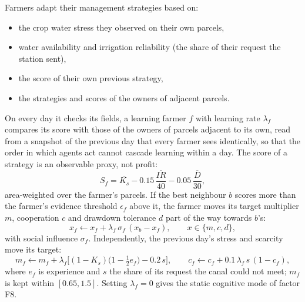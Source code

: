 \documentclass{article}
\begin{document}
\begin{changed}
Farmers adapt their management strategies based on:

\begin{itemize}
    \item the crop water stress they observed on their own parcels,
    \item water availability and irrigation reliability (the share of their request the station sent),
    \item the score of their own previous strategy,
    \item the strategies and scores of the owners of adjacent parcels.
\end{itemize}
\end{changed}

\begin{added}
On every day it checks its fields, a learning farmer $f$ with learning rate $\lambda_f$ compares its score with those of the owners of parcels adjacent to its own, read from a snapshot of the previous day that every farmer sees identically, so that the order in which agents act cannot cascade learning within a day. The score of a strategy is an observable proxy, not profit:
\begin{equation}
S_f = \overline{K_s} - 0.15\,\frac{\overline{IR}}{40} - 0.05\,\frac{\overline{D}}{30},
\label{eq:score}
\end{equation}
area-weighted over the farmer's parcels. If the best neighbour $b$ scores more than the farmer's evidence threshold $\epsilon_f$ above it, the farmer moves its target multiplier $m$, cooperation $c$ and drawdown tolerance $d$ part of the way towards $b$'s:
\begin{equation}
x_f \leftarrow x_f + \lambda_f\,\sigma_f\,(x_b - x_f), \qquad x \in \{m, c, d\},
\label{eq:copy}
\end{equation}
with social influence $\sigma_f$. Independently, the previous day's stress and scarcity move its target:
\begin{equation}
m_f \leftarrow m_f + \lambda_f\Big[(1-K_s)\big(1-\tfrac{1}{2}e_f\big) - 0.2\,s\Big], \qquad
c_f \leftarrow c_f + 0.1\,\lambda_f\, s\,(1-c_f),
\label{eq:stress_learning}
\end{equation}
where $e_f$ is experience and $s$ the share of its request the canal could not meet; $m_f$ is kept within $[0.65, 1.5]$. Setting $\lambda_f=0$ gives the static cognitive mode of factor F8.
\end{added}
\end{document}
